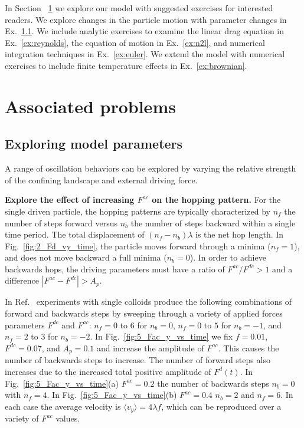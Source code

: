 \documentclass[twocolumn,preprintnumbers,amsmath,amssymb,aps,prb]{revtex4}
\begin{document}
In Section ~\ref{sec:problems}
we explore our model
with suggested exercises for interested readers.
We explore changes in the particle motion
with parameter changes in Ex.~\ref{ex:parameters}.
We include analytic exercises to examine the 
linear drag equation in Ex.~\ref{ex:reynolds}, 
the equation of motion in Ex.~\ref{ex:n2l},
and 
numerical integration techniques in Ex.~\ref{ex:euler}.
We extend the model with
numerical exercises 
to include finite temperature effects
in Ex.~\ref{ex:brownian}.

\section{Associated problems}
\label{sec:problems}	

  \subsection{Exploring model parameters}
  \label{ex:parameters}

  A range of oscillation behaviors
  can be explored by varying the
  relative strength of the confining landscape
  and external driving force.

  {\bf Explore the effect of increasing $F^{ac}$ on the hopping pattern.}
  For the single driven particle,
  the hopping patterns are typically characterized
  by $n_f$ the number of steps forward
  versus $n_b$ the number of steps backward within a single
  time period.
  The total displacement of $(n_f - n_b) \lambda$ 
  is the net hop length.  
  In Fig.~\ref{fig:2_Fd_vy_time},
  the particle moves forward through a minima ($n_f = 1$),
  and does not move backward a full minima ($n_b = 0$).  
  In order to achieve
  backwards hops,
  the driving parameters must have
  a ratio of $F^{ac}/F^{dc} > 1$ 
  and a difference $|F^{ac} - F^{dc}| > A_p$.

  In Ref.~\cite{Juniper2015}
  experiments with single colloids 
  produce 
  the following
  combinations of forward and backwards steps
  by sweeping through
  a variety of applied forces parameters $F^{dc}$ and $F^{ac}$:
  $n_f = 0$ to $6$ for $n_b = 0$,
  $n_f = 0$ to $5$ for $n_b = -1$,
  and
  $n_f = 2$ to $3$ for $n_b = -2$.
  In Fig.~\ref{fig:5_Fac_y_vs_time}
  we fix $f=0.01$, $F^{dc}=0.07$, and $A_p = 0.1$
  and increase
  the amplitude of $F^{ac}$.
  This causes the number of backwards steps to increase.
  The number of forward steps also increases
  due to the increased total positive amplitude of $F^d(t)$.
  In Fig.~\ref{fig:5_Fac_y_vs_time}(a) 
  $F^{ac} = 0.2$ %
  the number of backwards steps
  $n_b = 0$ with $n_f = 4$.
  In Fig.~\ref{fig:5_Fac_y_vs_time}(b) $F^{ac} = 0.4$
  $n_b = 2$ and $n_f = 6$.
  In each case the average velocity 
  is $\langle v_y \rangle = 4\lambda f$,
  which can be reproduced over a variety of $F^{ac}$ values.
\end{document}
